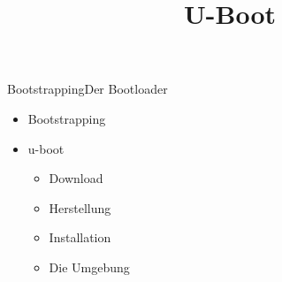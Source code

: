 \documentclass{beamer}
\title{U-Boot}
\begin{document}
\frame{\titlepage}

\begin{frame}{Bootstrapping}{Der Bootloader }
 \begin{itemize}
  \item Bootstrapping
  \item u-boot
  \begin{itemize}
  \item Download
  \item Herstellung
  \item Installation
  \item Die Umgebung 
  \end{itemize}
 \end{itemize}
\end{frame}




%
\end{document}
